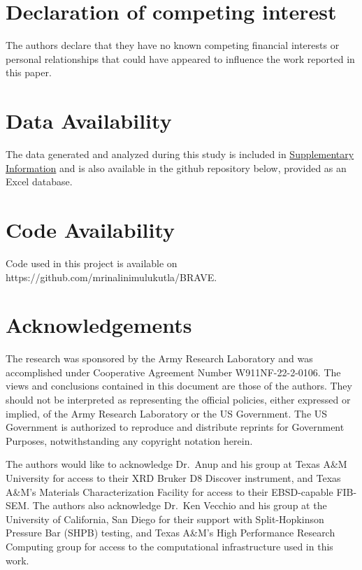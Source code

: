 \documentclass[preprint,12pt,times]{elsarticle}  %
\begin{document}
\section*{Declaration of competing interest}

    The authors declare that they have no known competing financial interests or personal relationships that could have appeared to influence the work reported in this paper.

\section*{Data Availability}

    The data generated and analyzed during this study is included in \underline{Supplementary Information} and is also available in the github repository below, provided as an Excel database.

\section*{Code Availability}

    Code used in this project is available on https://github.com/mrinalinimulukutla/BRAVE.

\section*{Acknowledgements}

The research was sponsored by the Army Research Laboratory and was accomplished under Cooperative Agreement Number W911NF-22-2-0106. The views and conclusions contained in this document are those of the authors. They should not be interpreted as representing the official policies, either expressed or implied, of the Army Research Laboratory or the US Government. The US Government is authorized to reproduce and distribute reprints for Government Purposes, notwithstanding any copyright notation herein. 
    
The authors would like to acknowledge Dr.\ Anup and his group at Texas A\&M University for access to their XRD Bruker D8 Discover instrument, and Texas A\&M's Materials Characterization Facility for access to their EBSD-capable FIB-SEM. The authors also acknowledge Dr.\ Ken Vecchio and his group at the University of California, San Diego for their support with Split-Hopkinson Pressure Bar (SHPB) testing, and Texas A\&M's High Performance Research Computing group for access to the computational infrastructure used in this work.
\end{document}
